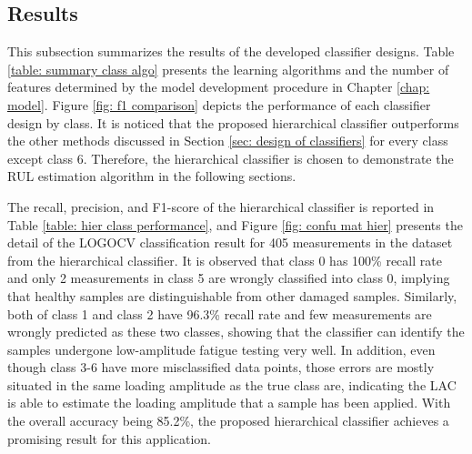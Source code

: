 \subsection{Results}
This subsection summarizes the results of the developed classifier designs. Table \ref{table: summary class algo} presents the learning algorithms and the number of features determined by the model development procedure in Chapter \ref{chap: model}. Figure \ref{fig: f1 comparison} depicts the performance of each classifier design by class. It is noticed that the proposed hierarchical classifier outperforms the other methods discussed in Section \ref{sec: design of classifiers} for every class except class 6. Therefore, the hierarchical classifier is chosen to demonstrate the RUL estimation algorithm in the following sections.

The recall, precision, and F1-score of the hierarchical classifier is reported in Table \ref{table: hier class performance}, and Figure \ref{fig: confu mat hier} presents the detail of the LOGOCV classification result for 405 measurements in the dataset from the hierarchical classifier. It is observed that class 0 has 100\% recall rate and only 2 measurements in class 5 are wrongly classified into class 0, implying that healthy samples are distinguishable from other damaged samples. Similarly, both of class 1 and class 2 have 96.3\% recall rate and few measurements are wrongly predicted as these two classes, showing that the classifier can identify the samples undergone low-amplitude fatigue testing very well. In addition, even though class 3-6 have more misclassified data points, those errors are mostly situated in the same loading amplitude as the true class are, indicating the LAC is able to estimate the loading amplitude that a sample has been applied. With the overall accuracy being 85.2\%, the proposed hierarchical classifier achieves a promising result for this application.

